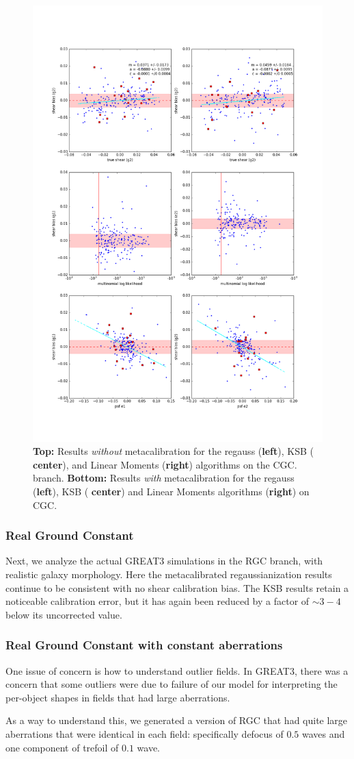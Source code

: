 \documentclass[iop]{emulateapj}
\begin{document}
\begin{figure}[t]
\begin{center}
\includegraphics[width=0.32\linewidth]{./Plots/moments-opt-shear_plots.png}
\end{center}
\caption{{\bf Top:} Results {\it without} metacalibration for the regauss ({\bf left}), KSB ({\bf
    center}), and Linear Moments ({\bf right}) algorithms on the CGC.
  branch.  {\bf Bottom:} Results {\it with} metacalibration for the regauss ({\bf left}), KSB ({\bf
    center}) and Linear Moments algorithms ({\bf right}) on CGC.}
\label{fig:cgc_corrected}
\end{figure}




\subsubsection{Real Ground Constant}

Next, we analyze the actual GREAT3 simulations in the RGC branch, with
realistic galaxy morphology. Here the metacalibrated regaussianization
results continue to be consistent with no shear calibration bias. The
KSB results retain a noticeable calibration error, but it has again
been reduced by a factor of $\sim3-4$ below its uncorrected value. 



\subsubsection{Real Ground Constant with constant aberrations}

One issue of concern is how to understand outlier fields.  In GREAT3,
there was a concern that some outliers were due to failure of our
model for interpreting the per-object shapes in fields that had large
aberrations.

As a way to understand this, we generated a version of RGC that had
quite large aberrations that were identical in each field:
specifically defocus of $0.5$ waves and one component of trefoil of
$0.1$ wave.
\end{document}
